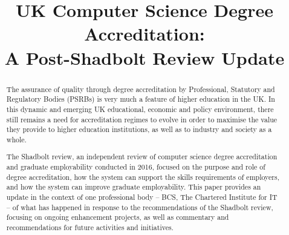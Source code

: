 \documentclass[sigconf]{acmart}
\begin{document}
\title[Post-Shadbolt UK Computer Science Degree Accreditation]{UK Computer Science Degree Accreditation:\\A Post-Shadbolt
  Review Update}










\renewcommand{\shortauthors}{Crick, Davenport,  Irons, and Prickett}

\begin{abstract}
The assurance of quality through degree accreditation by Professional,
Statutory and Regulatory Bodies (PSRBs) is very much a feature of
higher education in the UK.  In this dynamic and emerging UK
educational, economic and policy environment, there still remains a
need for accreditation regimes to evolve in order to maximise the
value they provide to higher education institutions, as well as to
industry and society as a whole.

The Shadbolt review, an independent review of computer science degree
accreditation and graduate employability conducted in 2016, focused on
the purpose and role of degree accreditation, how the system can
support the skills requirements of employers, and how the system can
improve graduate employability. This paper provides an update in the
context of one professional body -- BCS, The Chartered Institute for
IT -- of what has happened in response to the recommendations of the
Shadbolt review, focusing on ongoing enhancement projects, as well as
commentary and recommendations for future activities and initiatives.
\end{abstract}
\end{document}
